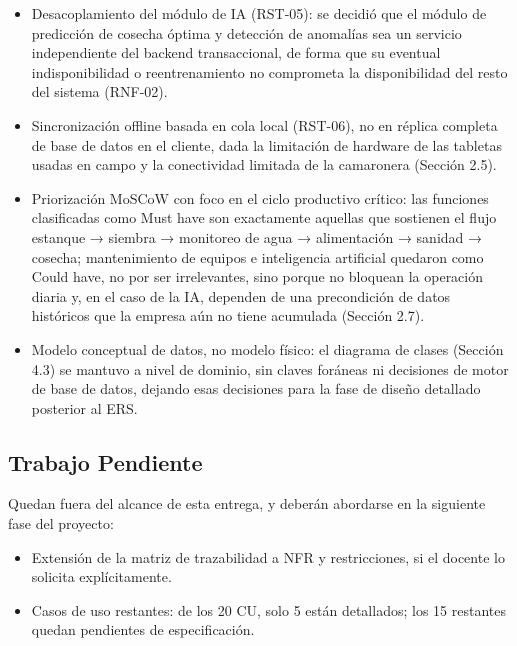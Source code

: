 \documentclass[11pt,a4paper]{article}
\begin{document}
\begin{itemize}
\item Desacoplamiento del módulo de IA (RST-05): se decidió que el módulo de predicción de cosecha óptima y detección de anomalías sea un servicio independiente del backend transaccional, de forma que su eventual indisponibilidad o reentrenamiento no comprometa la disponibilidad del resto del sistema (RNF-02).

\item Sincronización offline basada en cola local (RST-06), no en réplica completa de base de datos en el cliente, dada la limitación de hardware de las tabletas usadas en campo y la conectividad limitada de la camaronera (Sección 2.5).

\item Priorización MoSCoW con foco en el ciclo productivo crítico: las funciones clasificadas como Must have son exactamente aquellas que sostienen el flujo estanque → siembra → monitoreo de agua → alimentación → sanidad → cosecha; mantenimiento de equipos e inteligencia artificial quedaron como Could have, no por ser irrelevantes, sino porque no bloquean la operación diaria y, en el caso de la IA, dependen de una precondición de datos históricos que la empresa aún no tiene acumulada (Sección 2.7).

\item Modelo conceptual de datos, no modelo físico: el diagrama de clases (Sección 4.3) se mantuvo a nivel de dominio, sin claves foráneas ni decisiones de motor de base de datos, dejando esas decisiones para la fase de diseño detallado posterior al ERS.
\end{itemize}

\subsection{Trabajo Pendiente}

Quedan fuera del alcance de esta entrega, y deberán abordarse en la siguiente fase del proyecto:

\begin{itemize}

\item Extensión de la matriz de trazabilidad a NFR y restricciones, si el docente lo solicita explícitamente.


\item Casos de uso restantes: de los 20 CU, solo 5 están detallados; los 15 restantes quedan pendientes de especificación.
\end{itemize}
\end{document}
